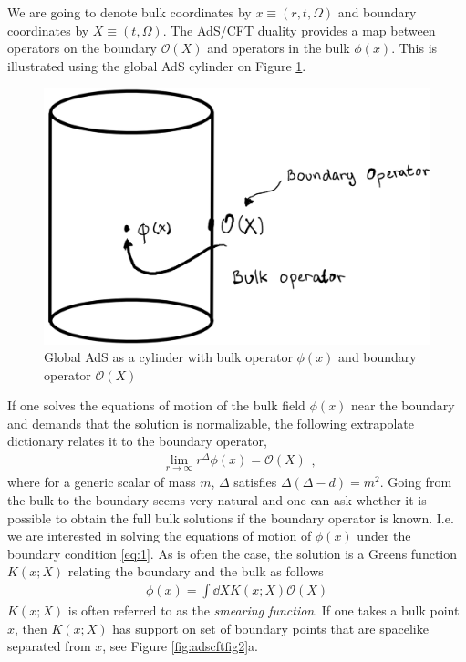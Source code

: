 \documentclass[letter,12pt]{article}
\newcommand{\BO}{\mathcal{O}}
\newcommand{\OO}{\mathcal{O}}
\begin{document}
We are going to denote bulk coordinates by $x\equiv (r,t,\Omega)$ and boundary coordinates by $X\equiv (t,\Omega)$. The AdS/CFT duality provides a map between operators on the boundary $\OO(X)$ and operators in the bulk $\phi(x)$. This is illustrated using the global AdS cylinder on Figure \ref{fig:adscftfig1}.
\begin{figure}[]
	\centering
	\includegraphics[width=0.6\linewidth]{ADS_CFT_Fig1}
	\caption{Global AdS as a cylinder with bulk operator $\phi(x)$ and boundary operator $\OO(X)$}
	\label{fig:adscftfig1}
\end{figure}
If one solves the equations of motion of the bulk field $\phi(x)$ near the boundary and demands that the solution is normalizable, the following extrapolate dictionary relates it to the boundary operator,
\begin{equation}
	\begin{aligned}
		\lim_{r\to \infty}r^{\Delta}\phi(x)=\BO(X)	\end{aligned}, \label{eq:1}
\end{equation}
where for a generic scalar of mass $m$, $\Delta$ satisfies $\Delta(\Delta-d)=m^2$. Going from the bulk to the boundary seems very natural and one can ask whether it is possible to obtain the full bulk solutions if the boundary operator is known. I.e. we are interested in solving the equations of motion of $\phi(x)$ under the boundary condition \eqref{eq:1}. 
As is often the case, the solution is a Greens function $ K(x;X)$ relating the boundary and the bulk as follows
\begin{equation}
	\begin{aligned}
		\phi(x)=\int\dd X K(x;X)\BO(X) \label{eq:2}
	\end{aligned}
\end{equation}
$ K(x;X)$ is often referred to as the \textit{smearing function}. If one takes a bulk point $x$, then $K(x;X)$ has support on set of boundary points that are spacelike separated from $x$, see Figure \ref{fig:adscftfig2}a. 
\end{document}
